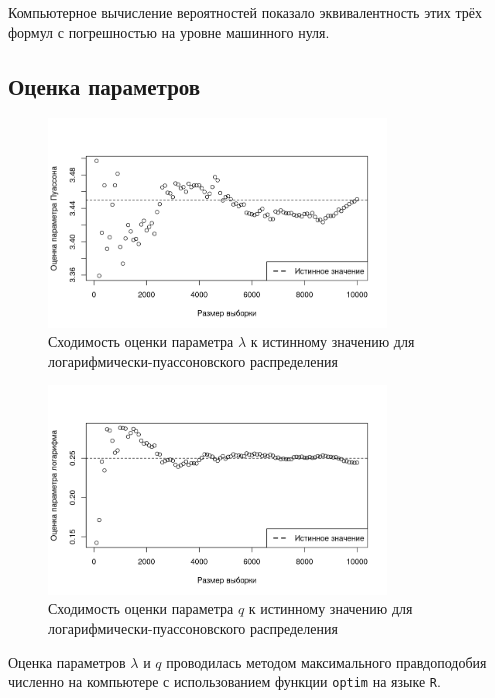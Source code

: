 \documentclass[12pt, specialist, subf, substylefile = spbu_report.rtx]{disser}
\begin{document}
	
	Компьютерное вычисление вероятностей показало эквивалентность этих трёх формул с погрешностью на уровне машинного нуля.
	
	\subsection{Оценка параметров}
	
	\begin{figure}[!ht]
		\centering
		\includegraphics[width = 0.8\textwidth]{logpoislambda}
		\caption{Сходимость оценки параметра $\lambda$ к истинному значению для логарифмически-пуассоновского распределения}
		\label{img:logpoislambda}
	\end{figure}
	
	\begin{figure}[!ht]
		\centering
		\includegraphics[width = 0.8\textwidth]{logpoisq}
		\caption{Сходимость оценки параметра $q$ к истинному значению для логарифмически-пуассоновского распределения}
		\label{img:logpoisq}
	\end{figure}
	
	Оценка параметров $\lambda$ и $q$ проводилась методом максимального правдоподобия численно на компьютере с использованием функции \verb|optim| на языке \verb|R|.
	
\end{document}
